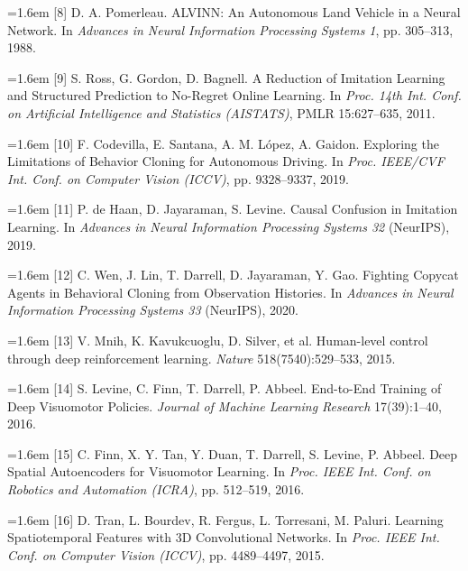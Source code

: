 \documentclass[10pt,a4paper]{article}
\begin{document}
{\hangindent=1.6em [8] D. A. Pomerleau. ALVINN: An Autonomous Land Vehicle in a Neural Network. In \textit{Advances in Neural Information Processing Systems 1}, pp. 305–313, 1988.\par}

{\hangindent=1.6em [9] S. Ross, G. Gordon, D. Bagnell. A Reduction of Imitation Learning and Structured Prediction to No-Regret Online Learning. In \textit{Proc. 14th Int. Conf. on Artificial Intelligence and Statistics (AISTATS)}, PMLR 15:627–635, 2011.\par}

{\hangindent=1.6em [10] F. Codevilla, E. Santana, A. M. López, A. Gaidon. Exploring the Limitations of Behavior Cloning for Autonomous Driving. In \textit{Proc. IEEE/CVF Int. Conf. on Computer Vision (ICCV)}, pp. 9328–9337, 2019.\par}

{\hangindent=1.6em [11] P. de Haan, D. Jayaraman, S. Levine. Causal Confusion in Imitation Learning. In \textit{Advances in Neural Information Processing Systems 32} (NeurIPS), 2019.\par}

{\hangindent=1.6em [12] C. Wen, J. Lin, T. Darrell, D. Jayaraman, Y. Gao. Fighting Copycat Agents in Behavioral Cloning from Observation Histories. In \textit{Advances in Neural Information Processing Systems 33} (NeurIPS), 2020.\par}

{\hangindent=1.6em [13] V. Mnih, K. Kavukcuoglu, D. Silver, et al. Human-level control through deep reinforcement learning. \textit{Nature} 518(7540):529–533, 2015.\par}

{\hangindent=1.6em [14] S. Levine, C. Finn, T. Darrell, P. Abbeel. End-to-End Training of Deep Visuomotor Policies. \textit{Journal of Machine Learning Research} 17(39):1–40, 2016.\par}

{\hangindent=1.6em [15] C. Finn, X. Y. Tan, Y. Duan, T. Darrell, S. Levine, P. Abbeel. Deep Spatial Autoencoders for Visuomotor Learning. In \textit{Proc. IEEE Int. Conf. on Robotics and Automation (ICRA)}, pp. 512–519, 2016.\par}

{\hangindent=1.6em [16] D. Tran, L. Bourdev, R. Fergus, L. Torresani, M. Paluri. Learning Spatiotemporal Features with 3D Convolutional Networks. In \textit{Proc. IEEE Int. Conf. on Computer Vision (ICCV)}, pp. 4489–4497, 2015.\par}
\end{document}
